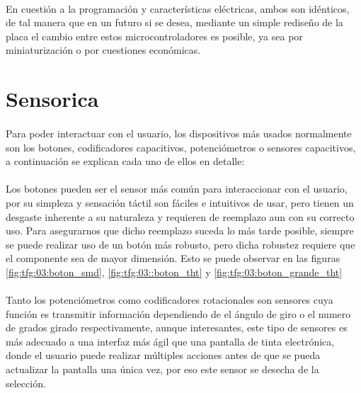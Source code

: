 \paragraph{} En cuestión a la programación y características eléctricas, ambos son idénticos, de tal manera que en un futuro si se desea, mediante un simple rediseño de la placa el cambio entre estos microcontroladores es posible, ya sea por miniaturización o por cuestiones económicas.

\section{Sensorica}

\paragraph{} Para poder interactuar con el usuario, los dispositivos más usados normalmente son los botones, codificadores capacitivos, potenciómetros o sensores capacitivos, a continuación se explican cada uno de ellos en detalle:

\paragraph{} Los botones pueden ser el sensor más común para interaccionar con el usuario, por su simpleza y sensación táctil son fáciles e intuitivos de usar, pero tienen un desgaste inherente a su naturaleza y requieren de reemplazo aun con su correcto uso. Para asegurarnos que dicho reemplazo suceda lo más tarde posible, siempre se puede realizar uso de un botón más robusto, pero dicha robustez requiere que el componente sea de mayor dimensión. Esto se puede observar en las figuras \ref{fig:tfg:03:boton_smd}, \ref{fig:tfg:03::boton_tht} y \ref{fig:tfg:03:boton_grande_tht}

\paragraph{} Tanto los potenciómetros como codificadores rotacionales son sensores cuya función es transmitir información dependiendo de el ángulo de giro o el numero de grados girado respectivamente, aunque interesantes, este tipo de sensores es más adecuado a una interfaz más ágil que una pantalla de tinta electrónica, donde el usuario puede realizar múltiples acciones antes de que se pueda actualizar la pantalla una única vez, por eso este sensor se desecha de la selección.


